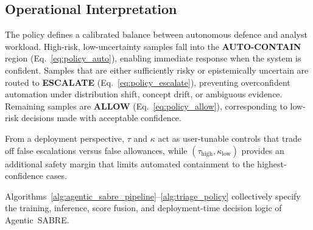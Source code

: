 \documentclass[3p]{elsarticle}
\begin{document}
\subsection{Operational Interpretation}
\label{subsec:policy_interpretation}

The policy defines a calibrated balance between autonomous defence and analyst workload.
High-risk, low-uncertainty samples fall into the \textbf{AUTO-CONTAIN} region
(Eq.~\ref{eq:policy_auto}), enabling immediate response when the system is confident.
Samples that are either sufficiently risky or epistemically uncertain are routed to
\textbf{ESCALATE} (Eq.~\ref{eq:policy_escalate}), preventing overconfident automation
under distribution shift, concept drift, or ambiguous evidence.
Remaining samples are \textbf{ALLOW} (Eq.~\ref{eq:policy_allow}), corresponding to
low-risk decisions made with acceptable confidence.

From a deployment perspective, $\tau$ and $\kappa$ act as user-tunable controls that
trade off false escalations versus false allowances, while
$(\tau_{\text{high}},\kappa_{\text{low}})$ provides an additional safety margin that
limits automated containment to the highest-confidence cases.


Algorithms~\ref{alg:agentic_sabre_pipeline}--\ref{alg:triage_policy}
collectively specify the training, inference, score fusion, and deployment-time
decision logic of Agentic~SABRE.
\end{document}

